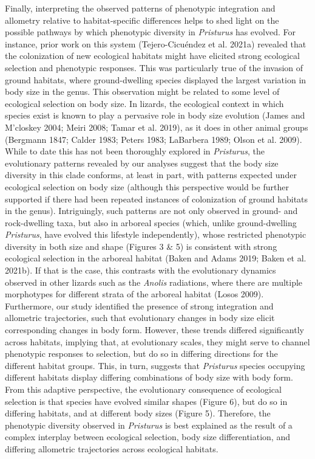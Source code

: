 \documentclass[
  11pt,
]{article}
\begin{document}
Finally, interpreting the observed patterns of phenotypic integration
and allometry relative to habitat-specific differences helps to shed
light on the possible pathways by which phenotypic diversity in
\emph{Pristurus} has evolved. For instance, prior work on this system
(Tejero-Cicuéndez et al. 2021a) revealed that the colonization of new
ecological habitats might have elicited strong ecological selection and
phenotypic responses. This was particularly true of the invasion of
ground habitats, where ground-dwelling species displayed the largest
variation in body size in the genus. This observation might be related
to some level of ecological selection on body size. In lizards, the
ecological context in which species exist is known to play a pervasive
role in body size evolution (James and M'closkey 2004; Meiri 2008; Tamar
et al. 2019), as it does in other animal groups (Bergmann 1847; Calder
1983; Peters 1983; LaBarbera 1989; Olson et al. 2009). While to date
this has not been thoroughly explored in \emph{Pristurus}, the
evolutionary patterns revealed by our analyses suggest that the body
size diversity in this clade conforms, at least in part, with patterns
expected under ecological selection on body size (although this
perspective would be further supported if there had been repeated
instances of colonization of ground habitats in the genus).
Intriguingly, such patterns are not only observed in ground- and
rock-dwelling taxa, but also in arboreal species (which, unlike
ground-dwelling \emph{Pristurus}, have evolved this lifestyle
independently), whose restricted phenotypic diversity in both size and
shape (Figures 3 \& 5) is consistent with strong ecological selection in
the arboreal habitat (Baken and Adams 2019; Baken et al. 2021b). If that
is the case, this contrasts with the evolutionary dynamics observed in
other lizards such as the \emph{Anolis} radiations, where there are
multiple morphotypes for different strata of the arboreal habitat (Losos
2009). Furthermore, our study identified the presence of strong
integration and allometric trajectories, such that evolutionary changes
in body size elicit corresponding changes in body form. However, these
trends differed significantly across habitats, implying that, at
evolutionary scales, they might serve to channel phenotypic responses to
selection, but do so in differing directions for the different habitat
groups. This, in turn, suggests that \emph{Pristurus} species occupying
different habitats display differing combinations of body size with body
form. From this adaptive perspective, the evolutionary consequence of
ecological selection is that species have evolved similar shapes (Figure
6), but do so in differing habitats, and at different body sizes (Figure
5). Therefore, the phenotypic diversity observed in \emph{Pristurus} is
best explained as the result of a complex interplay between ecological
selection, body size differentiation, and differing allometric
trajectories across ecological habitats.
\end{document}
